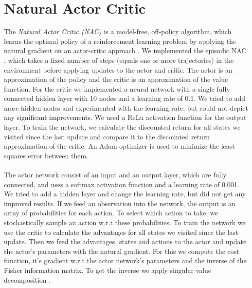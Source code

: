 
\section{Natural Actor Critic}
\label{sec:nac}
The \textit{Natural Actor Critic (NAC)} \citep{peters2008natural} is a model-free, off-policy algorithm, which learns the optimal policy of a reinforcement learning problem by applying the natural gradient \citep{amari1998natural} on an actor-critic approach \citep{sutton1998introduction}. We implemented the episodic NAC \citep{peters2008natural}, which takes a fixed number of steps (equals one or more trajectories) in the environment before applying updates to the actor and critic. The actor is an approximation of the policy and the critic is an approximation of the value function. For the critic we implemented a neural network with a single fully connected hidden layer with 10 nodes and a learning rate of 0.1. We tried to add more hidden nodes and experimented with the learning rate, but could not depict any significant improvements. We used a ReLu activation function \citep{glorot2011deep} for the output layer.
To train the network, we calculate the discounted return for all states we visited since the last update and compare it to the discounted return approximation of the critic. An Adam optimizer \citep{kingma2014adam} is used to minimize the least squares error between them.\\
\\ 
The actor network consist of an input and an output layer, which are fully connected, and uses a softmax activation function and a learning rate of 0.001. We tried to add a hidden layer and change the learning rate, but did not get any improved results. If we feed an observation into the network, the output is an array of probabilities for each action. To select which action to take, we stochastically sample an action w.r.t these probabilities. To train the network we use the critic to calculate the advantages for all states we visited since the last update. Then we feed the advantages, states and actions to the actor and update the actor's parameters with the natural gradient. For this we compute the cost function, it's gradient w.r.t the actor network's parameters and the inverse of the Fisher information matrix. To get the inverse we apply singular value decomposition \citep{golub1965calculating}.

